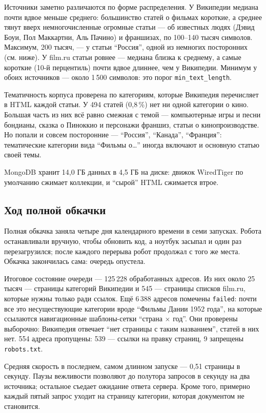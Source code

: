 Источники заметно различаются по форме распределения. У Википедии медиана почти
вдвое меньше среднего: большинство статей о фильмах короткие, а среднее тянут
вверх немногочисленные огромные статьи --- об известных людях (Дэвид Боуи, Пол
Маккартни, Аль Пачино) и франшизах, по 100--140 тысяч символов. Максимум, 200 тысяч,
--- у статьи \enquote{Россия}, одной из немногих посторонних (см. ниже). У film.ru статьи ровнее --- медиана близка к среднему, а самые
короткие (10-й перцентиль) почти вдвое длиннее, чем у Википедии. Минимум у обоих
источников --- около 1\,500 символов: это порог \texttt{min\_text\_length}.

Тематичность корпуса проверена по категориям, которые Википедия перечисляет в
HTML каждой статьи. У 494 статей (0,8\,\%) нет ни одной категории о кино. Большая
часть из них всё равно смежная с темой --- компьютерные игры и песни бондианы,
сказка о Пиноккио и персонажи франшиз, статьи о кинопроизводстве. Но попали и
совсем посторонние --- \enquote{Россия}, \enquote{Канада}, \enquote{Франция}: тематические категории
вида \enquote{Фильмы о\ldots} иногда включают и основную статью своей темы.

MongoDB хранит 14,0 ГБ данных в 4,5 ГБ на диске: движок WiredTiger по умолчанию
сжимает коллекции, и \enquote{сырой} HTML сжимается втрое.

\subsection*{Ход полной обкачки}

Полная обкачка заняла четыре дня календарного времени в семи запусках. Робота
останавливали вручную, чтобы обновить код, а ноутбук засыпал и один раз
перезагрузился; после каждого перерыва робот продолжал с того же места. Обкачка закончилась сама: очередь опустела.

Итоговое состояние очереди --- 125\,228 обработанных адресов. Из них около
25 тысяч --- страницы категорий Википедии и 545 --- страницы списков film.ru,
которые нужны только ради ссылок. Ещё 6\,388 адресов помечены \texttt{failed}: почти
все это несуществующие категории вроде \enquote{Фильмы Дании 1952 года}, на
которые ссылаются навигационные шаблоны-сетки \enquote{страна $\times$ год}. Они
проверены выборочно: Википедия отвечает \enquote{нет страницы с таким
названием}, статей в них нет. 554 адреса пропущены: 539 --- ссылки на правку
страниц, 9 запрещены \texttt{robots.txt}.

Средняя скорость в последнем, самом длинном запуске --- 0,51 страницы в секунду.
Паузы вежливости позволяют до полутора запросов в секунду на два источника;
остальное съедает ожидание ответа сервера. Кроме того, примерно каждый пятый
запрос уходит на страницу категории, которая документом не становится.

